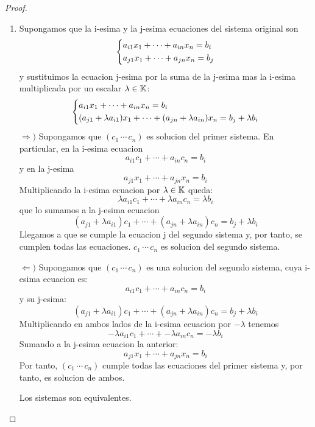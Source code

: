 \begin{proof}
\begin{enumerate}
		\item Supongamos que la i-esima y la j-esima ecuaciones del sistema original son
		      \[
			      \begin{dcases}
				      a_{i1}x_1 + \cdots + a_{in}x_n = b_i \\
				      a_{j1}x_1 + \cdots + a_{jn}x_n = b_j
			      \end{dcases}
		      \]
		      y sustituimos la ecuacion j-esima por la suma de la j-esima mas la i-esima multiplicada por un escalar \(\lambda \in \mathbb{K} \):
		      \[
			      \begin{dcases}
				      a_{i1}x_1 + \cdots + a_{in}x_n = b_i \\
				      (a_{j1} + \lambda a_{i1})x_1 + \cdots + (a_{jn}+\lambda a_{in})x_n = b_j + \lambda b_i
			      \end{dcases}
		      \]
		      \(\Rightarrow ) \) Supongamos que \((c_1 \, \cdots \, c_n )\) es solucion del primer sistema. En particular, en la i-esima ecuacion
		      \[
			      a_{i1}c_1 + \cdots + a_{in}c_n = b_i
		      \]
		      y en la j-esima
		      \[
			      a_{j1}x_1 + \cdots + a_{jn}x_n = b_i
		      \]
		      Multiplicando la i-esima ecuacion por \(\lambda \in  \mathbb{K} \) queda:
		      \[
			      \lambda a_{i1}c_1 + \cdots + \lambda a_{in}c_n = \lambda b_i
		      \]
		      que lo sumamos a la j-esima ecuacion
		      \[
			      (a_{j1} + \lambda a_{i1})c_1 + \cdots + (a_{jn}+\lambda a_{in})c_n = b_j + \lambda b_i
		      \]
		      Llegamos a que se cumple la ecuacion j del segundo sistema y, por tanto, se cumplen todas las ecuaciones. \(c_1 \, \cdots \, c_n \) es solucion del segundo sistema.

		      \(\Leftarrow ) \) Supongamos que \((c_1 \, \cdots \, c_n )\) es una solucion del segundo sistema, cuya i-esima ecuacion es:
		      \[
			      a_{i1}c_1 + \cdots + a_{in}c_n =  b_i
		      \]
		      y su j-esima:
		      \[
			      (a_{j1} + \lambda a_{i1})c_1 + \cdots + (a_{jn}+\lambda a_{in})c_n = b_j + \lambda b_i
		      \]
		      Multiplicando en ambos lados de la i-esima ecuacion por \(-\lambda\) tenemos
		      \[
			      -\lambda a_{i1}c_1 + \cdots + -\lambda a_{in}c_n = -\lambda b_i
		      \]
		      Sumando a la j-esima ecuacion la anterior:
		      \[
			      a_{j1}x_1 + \cdots + a_{jn}x_n = b_i
		      \]
		      Por tanto, \((c_1 \, \cdots \, c_n )\) cumple todas las ecuaciones del primer sistema y, por tanto, es solucion de ambos.

		      Los sistemas son equivalentes.
	\end{enumerate}
\end{proof}

